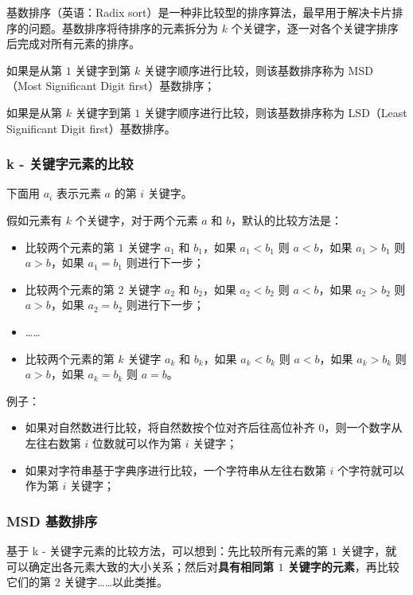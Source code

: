 \documentclass[12pt]{article}
\begin{document}
基数排序（英语：Radix sort）是一种非比较型的排序算法，最早用于解决卡片排序的问题。基数排序将待排序的元素拆分为 $k$ 个关键字，逐一对各个关键字排序后完成对所有元素的排序。

如果是从第 $1$ 关键字到第 $k$ 关键字顺序进行比较，则该基数排序称为 MSD（Most Significant Digit first）基数排序；

如果是从第 $k$ 关键字到第 $1$ 关键字顺序进行比较，则该基数排序称为 LSD（Least Significant Digit first）基数排序。

\subsubsection{k - 关键字元素的比较}

下面用 $a_i$ 表示元素 $a$ 的第 $i$ 关键字。

假如元素有 $k$ 个关键字，对于两个元素 $a$ 和 $b$，默认的比较方法是：

\begin{itemize}
    \item 比较两个元素的第 $1$ 关键字 $a_1$ 和 $b_1$，如果 $a_1 < b_1$ 则 $a < b$，如果 $a_1 > b_1$ 则 $a > b$，如果 $a_1 = b_1$ 则进行下一步；
    \item 比较两个元素的第 $2$ 关键字 $a_2$ 和 $b_2$，如果 $a_2 < b_2$ 则 $a < b$，如果 $a_2 > b_2$ 则 $a > b$，如果 $a_2 = b_2$ 则进行下一步；
    \item ……
    \item 比较两个元素的第 $k$ 关键字 $a_k$ 和 $b_k$，如果 $a_k < b_k$ 则 $a < b$，如果 $a_k > b_k$ 则 $a > b$，如果 $a_k = b_k$ 则 $a = b$。
\end{itemize}

例子：

\begin{itemize}
    \item 如果对自然数进行比较，将自然数按个位对齐后往高位补齐 $0$，则一个数字从左往右数第 $i$ 位数就可以作为第 $i$ 关键字；
    \item 如果对字符串基于字典序进行比较，一个字符串从左往右数第 $i$ 个字符就可以作为第 $i$ 关键字；
\end{itemize}

\subsubsection{MSD 基数排序}

基于 k - 关键字元素的比较方法，可以想到：先比较所有元素的第 $1$ 关键字，就可以确定出各元素大致的大小关系；然后对\textbf{具有相同第 $1$ 关键字的元素}，再比较它们的第 $2$ 关键字……以此类推。
\end{document}
